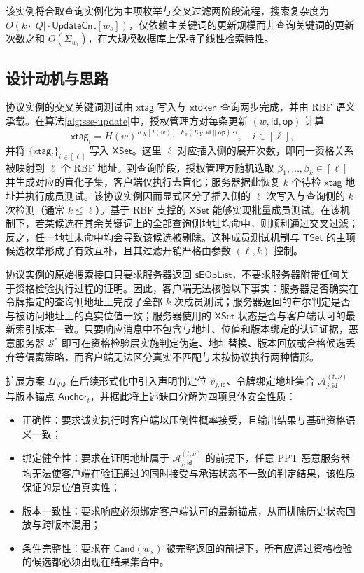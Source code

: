 该实例将合取查询实例化为主项枚举与交叉过滤两阶段流程，搜索复杂度为 $O(k\cdot|Q|\cdot\mathsf{UpdateCnt}[w_s])$，仅依赖主关键词的更新规模而非查询关键词的更新次数之和 $O(\varSigma_{w_i})$，在大规模数据库上保持子线性检索特性。

\subsection{设计动机与思路}\label{subsec:vq-gap}
协议实例的交叉关键词测试由 $\mathsf{xtag}$ 写入与 $\mathsf{xtoken}$ 查询两步完成，并由 RBF 语义承载。在算法\ref{alg:sse-update}中，授权管理方对每条更新 $(w,\mathsf{id},\mathsf{op})$ 计算
\begin{equation}
\mathsf{xtag}_i=H(w)^{K_X[I(w)]\cdot F_p(K_Y,\mathsf{id}\|\mathsf{op})\cdot i},\quad i\in[\ell]\text{,}
\end{equation}
并将 $\{\mathsf{xtag}_i\}_{i\in[\ell]}$ 写入 $\mathsf{XSet}$。这里 $\ell$ 对应插入侧的展开次数，即同一资格关系被映射到 $\ell$ 个 RBF 地址。到查询阶段，授权管理方随机选取 $\beta_1,\ldots,\beta_k\in[\ell]$ 并生成对应的盲化子集，客户端仅执行去盲化；服务器据此恢复 $k$ 个待检 $\mathsf{xtag}$ 地址并执行成员测试。该协议实例因而显式区分了插入侧的 $\ell$ 次写入与查询侧的 $k$ 次检测（通常 $k\le \ell$）。基于 RBF 支撑的 $\mathsf{XSet}$ 能够实现批量成员测试。在该机制下，若某候选在其余关键词上的全部查询侧地址均命中，则顺利通过交叉过滤；反之，任一地址未命中均会导致该候选被剔除。这种成员测试机制与 $\mathsf{TSet}$ 的主项候选枚举形成了有效互补，且其过滤开销严格由参数 $(\ell,k)$ 控制。

协议实例的原始搜索接口只要求服务器返回 $\mathsf{sEOpList}$，不要求服务器附带任何关于资格检验执行过程的证明。因此，客户端无法核验以下事实：服务器是否确实在令牌指定的查询侧地址上完成了全部 $k$ 次成员测试；服务器返回的布尔判定是否与被访问地址上的真实位值一致；服务器使用的 $\mathsf{XSet}$ 状态是否与客户端认可的最新索引版本一致。只要响应消息中不包含与地址、位值和版本绑定的认证证据，恶意服务器 $\mathcal{S}^*$ 即可在资格检验层实施判定伪造、地址替换、版本回放或合格候选丢弃等偏离策略，而客户端无法区分真实不匹配与未按协议执行两种情形。

扩展方案 $\Pi_{\mathsf{VQ}}$ 在后续形式化中引入声明判定位 $\widehat{v}_{j,\mathsf{id}}$、令牌绑定地址集合 $\mathcal{A}_{j,\mathsf{id}}^{(t,\nu)}$ 与版本锚点 $\mathsf{Anchor}_t$，并据此将上述缺口分解为四项具体安全性质：
\begin{itemize}
  \item 正确性：要求诚实执行时客户端以压倒性概率接受，且输出结果与基础资格语义一致；
  \item 绑定健全性：要求在证明地址属于 $\mathcal{A}_{j,\mathsf{id}}^{(t,\nu)}$ 的前提下，任意 PPT 恶意服务器均无法使客户端在验证通过的同时接受与承诺状态不一致的判定结果，该性质保证的是位值真实性；
  \item 版本一致性：要求响应必须绑定客户端认可的最新锚点，从而排除历史状态回放与跨版本混用；
  \item 条件完整性：要求在 $\mathsf{Cand}(w_s)$ 被完整返回的前提下，所有应通过资格检验的候选都必须出现在结果集合中。
\end{itemize} 


